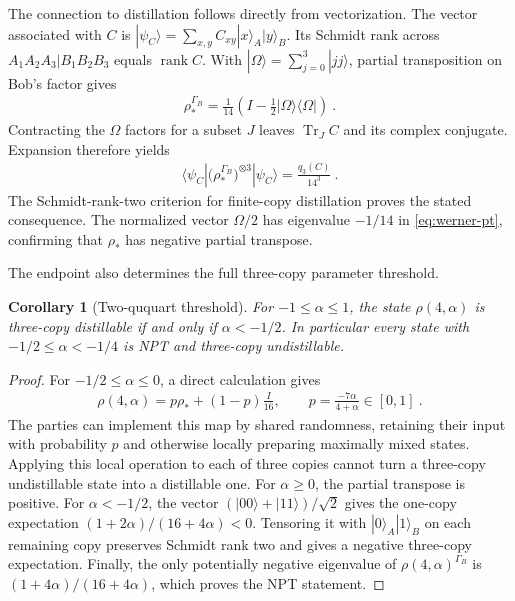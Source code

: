 \documentclass[aps,pra,reprint,superscriptaddress,amsmath,amssymb,floatfix,nofootinbib]{revtex4-2}
\newcommand{\Tr}{\operatorname{Tr}}
\newcommand{\rk}{\operatorname{rank}}
\newtheorem{corollary}[theorem]{Corollary}
\begin{document}
The connection to distillation follows directly from vectorization.
The vector associated with $C$ is
$|\psi_C\rangle=\sum_{x,y}C_{xy}|x\rangle_A|y\rangle_B$.
Its Schmidt rank across $A_1A_2A_3|B_1B_2B_3$ equals $\rk C$.
With $|\Omega\rangle=\sum_{j=0}^3|jj\rangle$, partial transposition
on Bob's factor gives
\begin{align}
 \rho_*^{\Gamma_B}
 =\frac1{14}\left(I-\frac12|\Omega\rangle\langle\Omega|\right)\ .
 \label{eq:werner-pt}
\end{align}
Contracting the $\Omega$ factors for a subset $J$ leaves
$\Tr_JC$ and its complex conjugate. Expansion therefore yields
\begin{align}
 \langle\psi_C|\bigl(\rho_*^{\Gamma_B}\bigr)^{\otimes3}
                  |\psi_C\rangle
 =\frac{q_3(C)}{14^3}\ .
 \label{eq:distillation-form}
\end{align}
The Schmidt-rank-two criterion for finite-copy distillation
\cite{HHH,DCLB} proves the stated consequence.
The normalized vector $\Omega/2$ has eigenvalue $-1/14$ in
\cref{eq:werner-pt}, confirming that $\rho_*$ has negative partial
transpose.

The endpoint also determines the full three-copy parameter threshold.

\begin{corollary}[Two-ququart threshold]
\label{cor:threshold}
For $-1\leq\alpha\leq1$, the state $\rho(4,\alpha)$ is three-copy
distillable if and only if $\alpha<-1/2$.
In particular every state with $-1/2\leq\alpha<-1/4$ is NPT and
three-copy undistillable.
\end{corollary}

\begin{proof}
For $-1/2\leq\alpha\leq0$, a direct calculation gives
\begin{align}
 \rho(4,\alpha)
 =p\rho_*+(1-p)\frac I{16},
 \qquad p=\frac{-7\alpha}{4+\alpha}\in[0,1]\ .
 \label{eq:local-replacement}
\end{align}
The parties can implement this map by shared randomness, retaining their
input with probability $p$ and otherwise locally preparing maximally
mixed states. Applying this local operation to each of three copies
cannot turn a three-copy undistillable state into a distillable one.
For $\alpha\geq0$, the partial transpose is positive.
For $\alpha<-1/2$, the vector
$(|00\rangle+|11\rangle)/\sqrt2$ gives the one-copy expectation
$(1+2\alpha)/(16+4\alpha)<0$.
Tensoring it with $|0\rangle_A|1\rangle_B$ on each remaining copy
preserves Schmidt rank two and gives a negative three-copy expectation.
Finally, the only potentially negative eigenvalue of
$\rho(4,\alpha)^{\Gamma_B}$ is
$(1+4\alpha)/(16+4\alpha)$, which proves the NPT statement.
\end{proof}
\end{document}
